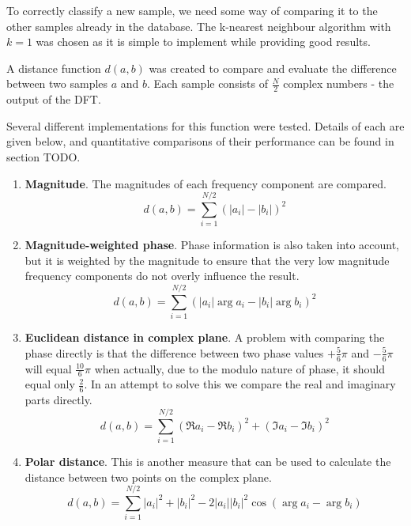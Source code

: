 To correctly classify a new sample, we need some way of comparing it to the other samples already in the database.
The k-nearest neighbour algorithm with $k=1$ was chosen as it is simple to implement while providing good results.

A distance function $d(a,b)$ was created to compare and evaluate the difference between two samples $a$ and $b$.
Each sample consists of $\frac{N}{2}$ complex numbers - the output of the DFT.

Several different implementations for this function were tested.
Details of each are given below, and quantitative comparisons of their performance can be found in section TODO.

\begin{enumerate}
	\item \textbf{Magnitude}.
		The magnitudes of each frequency component are compared.
		\begin{equation}
			d(a, b) = \sum_{i=1}^{N/2} \left( \left|a_i\right| - \left|b_i\right| \right)^2
		\end{equation}
	
	\item \textbf{Magnitude-weighted phase}.
		Phase information is also taken into account, but it is weighted by the magnitude to ensure that
		the very low magnitude frequency components do not overly influence the result.
		\begin{equation}
			d(a, b) = \sum_{i=1}^{N/2} \left( \left|a_i\right| \arg a_i - \left|b_i\right| \arg b_i \right)^2
		\end{equation}

	\item \textbf{Euclidean distance in complex plane}.
		A problem with comparing the phase directly is that the difference between two phase values $+\frac{5}{6}\pi$ and $-\frac{5}{6}\pi$ will
		equal $\frac{10}{6}\pi$ when actually, due to the modulo nature of phase, it should equal only $\frac{2}{6}$.
		In an attempt to solve this we compare the real and imaginary parts directly.
		\begin{equation}
			d(a, b) = \sum_{i=1}^{N/2} \left( \Re{a_i} - \Re{b_i} \right)^2 + \left( \Im{a_i} - \Im{b_i} \right)^2
		\end{equation}
	
	\item \textbf{Polar distance}.
		This is another measure that can be used to calculate the distance between two points on the complex plane.
		\begin{equation}
			d(a, b) = \sum_{i=1}^{N/2} \left|a_i\right|^2 + \left|b_i\right|^2 - 2 \left|a_i\right| \left|b_i\right|^2 \cos\left(\arg a_i - \arg b_i\right)
		\end{equation}
	

\end{enumerate}
